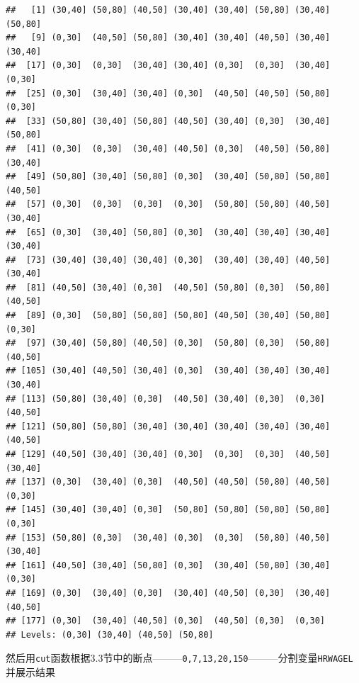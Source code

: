 \documentclass[]{article}
\newenvironment{Shaded}{\begin{snugshade}}{\end{snugshade}}
\newcommand{\DataTypeTok}[1]{\textcolor[rgb]{0.13,0.29,0.53}{#1}}
\newcommand{\DecValTok}[1]{\textcolor[rgb]{0.00,0.00,0.81}{#1}}
\newcommand{\KeywordTok}[1]{\textcolor[rgb]{0.13,0.29,0.53}{\textbf{#1}}}
\newcommand{\NormalTok}[1]{#1}
\newcommand{\OperatorTok}[1]{\textcolor[rgb]{0.81,0.36,0.00}{\textbf{#1}}}
\newcommand{\StringTok}[1]{\textcolor[rgb]{0.31,0.60,0.02}{#1}}
\begin{document}
\begin{verbatim}
##   [1] (30,40] (50,80] (40,50] (30,40] (30,40] (50,80] (30,40] (50,80]
##   [9] (0,30]  (40,50] (50,80] (30,40] (30,40] (40,50] (30,40] (30,40]
##  [17] (0,30]  (0,30]  (30,40] (30,40] (0,30]  (0,30]  (30,40] (0,30] 
##  [25] (0,30]  (30,40] (30,40] (0,30]  (40,50] (40,50] (50,80] (0,30] 
##  [33] (50,80] (30,40] (50,80] (40,50] (30,40] (0,30]  (30,40] (50,80]
##  [41] (0,30]  (0,30]  (30,40] (40,50] (0,30]  (40,50] (50,80] (30,40]
##  [49] (50,80] (30,40] (50,80] (0,30]  (30,40] (50,80] (50,80] (40,50]
##  [57] (0,30]  (0,30]  (0,30]  (0,30]  (50,80] (50,80] (40,50] (30,40]
##  [65] (0,30]  (30,40] (50,80] (0,30]  (30,40] (30,40] (30,40] (30,40]
##  [73] (30,40] (30,40] (30,40] (0,30]  (30,40] (30,40] (40,50] (30,40]
##  [81] (40,50] (30,40] (0,30]  (40,50] (50,80] (0,30]  (50,80] (40,50]
##  [89] (0,30]  (50,80] (50,80] (50,80] (40,50] (30,40] (50,80] (0,30] 
##  [97] (30,40] (50,80] (40,50] (0,30]  (50,80] (0,30]  (50,80] (40,50]
## [105] (30,40] (40,50] (30,40] (0,30]  (30,40] (30,40] (30,40] (30,40]
## [113] (50,80] (30,40] (0,30]  (40,50] (30,40] (0,30]  (0,30]  (40,50]
## [121] (50,80] (50,80] (30,40] (30,40] (30,40] (30,40] (30,40] (40,50]
## [129] (40,50] (30,40] (30,40] (0,30]  (0,30]  (0,30]  (40,50] (30,40]
## [137] (0,30]  (30,40] (0,30]  (40,50] (40,50] (50,80] (40,50] (0,30] 
## [145] (30,40] (30,40] (0,30]  (50,80] (50,80] (50,80] (50,80] (0,30] 
## [153] (50,80] (0,30]  (30,40] (0,30]  (0,30]  (50,80] (40,50] (30,40]
## [161] (40,50] (30,40] (50,80] (0,30]  (30,40] (50,80] (30,40] (0,30] 
## [169] (0,30]  (30,40] (0,30]  (30,40] (40,50] (0,30]  (30,40] (40,50]
## [177] (0,30]  (30,40] (40,50] (0,30]  (40,50] (0,30]  (0,30] 
## Levels: (0,30] (30,40] (40,50] (50,80]
\end{verbatim}

然后用\texttt{cut}函数根据3.3节中的断点---------\texttt{0,7,13,20,150}---------分割变量\texttt{HRWAGEL}并展示结果

\begin{Shaded}
\end{Shaded}
\end{document}
